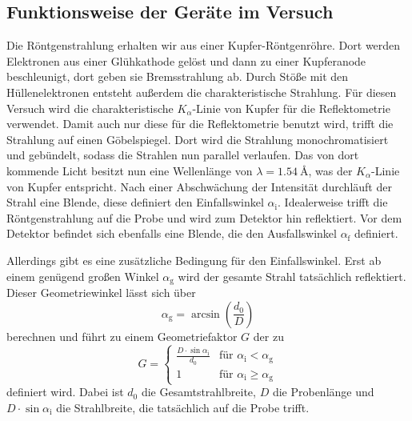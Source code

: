 \subsection{Funktionsweise der Geräte im Versuch}
\label{theo3}
 
Die Röntgenstrahlung erhalten wir aus einer Kupfer-Röntgenröhre.
Dort werden Elektronen aus einer Glühkathode gelöst und dann zu einer Kupferanode beschleunigt, dort geben sie Bremsstrahlung ab.
Durch Stöße mit den Hüllenelektronen entsteht außerdem die charakteristische Strahlung.
Für diesen Versuch wird die charakteristische $K_\alpha$-Linie von Kupfer für die Reflektometrie verwendet.
Damit auch nur diese für die Reflektometrie benutzt wird, trifft die Strahlung auf einen Göbelspiegel.
Dort wird die Strahlung monochromatisiert und gebündelt, sodass die Strahlen nun parallel verlaufen.
Das von dort kommende Licht besitzt nun eine Wellenlänge von $\lambda = \SI{1.54}{\angstrom}$, was der $K_\alpha$-Linie von Kupfer entspricht.
Nach einer Abschwächung der Intensität durchläuft der Strahl eine Blende, diese definiert den Einfallswinkel $\alpha_\text{i}$.
Idealerweise trifft die Röntgenstrahlung auf die Probe und wird zum Detektor hin reflektiert.
Vor dem Detektor befindet sich ebenfalls eine Blende, die den Ausfallswinkel $\alpha_\text{f}$ definiert.

Allerdings gibt es eine zusätzliche Bedingung für den Einfallswinkel.
Erst ab einem genügend großen Winkel $\alpha_\text{g}$ wird der gesamte Strahl tatsächlich reflektiert.
Dieser Geometriewinkel lässt sich über 
\begin{equation}
    \alpha_\text{g} = \arcsin\left(\frac{d_0}{D}\right)
    \label{eq:a_g}
\end{equation}
berechnen und führt zu einem Geometriefaktor $G$ der zu
\begin{equation}
    G = 
    \begin{cases}
        \frac{D \cdot \sin{\alpha _\text{i}}}{d_\text{0}} & \text{für } \alpha_\text{i} < \alpha_\text{g} \\
        1 & \text{für } \alpha_\text{i} \geq \alpha_\text{g}
    \end{cases}
    \label{eq:geo}
\end{equation}
definiert wird.
Dabei ist $d_0$ die Gesamtstrahlbreite, $D$ die Probenlänge und $D \cdot \sin{\alpha _\text{i}}$ die Strahlbreite, die tatsächlich auf die Probe trifft.

